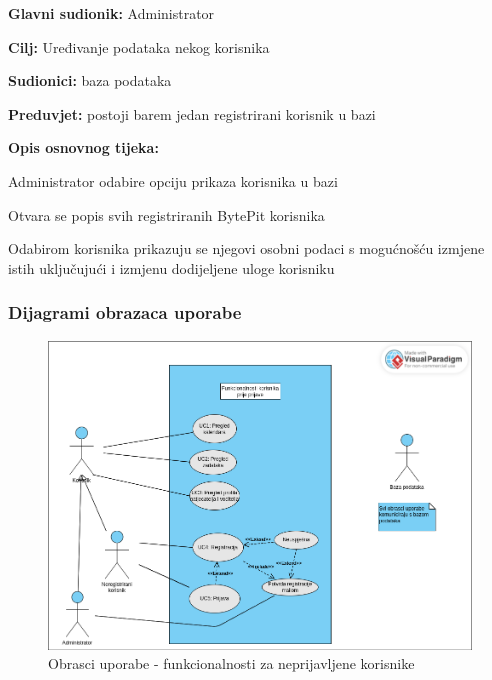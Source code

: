 					
					
					\noindent {}
					\begin{packed_item}
						
						\item \textbf{Glavni sudionik: }Administrator
						\item \textbf{Cilj:} Uređivanje podataka nekog korisnika
						\item \textbf{Sudionici:} baza podataka
						\item \textbf{Preduvjet:} postoji barem jedan registrirani korisnik u bazi 
						\item \textbf{Opis osnovnog tijeka:}
						
						\item[] \begin{packed_enum}
							\item Administrator odabire opciju prikaza korisnika u bazi
							\item Otvara se popis svih registriranih BytePit korisnika
							\item Odabirom korisnika prikazuju se njegovi osobni podaci s mogućnošću izmjene istih uključujući i izmjenu dodijeljene uloge korisniku
							
						\end{packed_enum}
					\end{packed_item}
				
					
				\subsubsection{Dijagrami obrazaca uporabe}
					
					\begin{figure}[H]
						\includegraphics[scale=0.4]{dijagrami/obrasci_uporabe1.png} 
						\centering
						\caption{Obrasci uporabe - funkcionalnosti za neprijavljene korisnike}
						\label{fig:obrasci_uporabe1}
					\end{figure}
					
